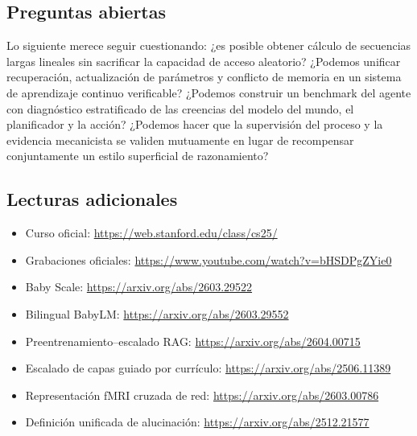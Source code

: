 \subsection{Preguntas abiertas}

Lo siguiente merece seguir cuestionando: ¿es posible obtener cálculo de secuencias largas lineales sin sacrificar la capacidad de acceso aleatorio? ¿Podemos unificar recuperación, actualización de parámetros y conflicto de memoria en un sistema de aprendizaje continuo verificable? ¿Podemos construir un benchmark del agente con diagnóstico estratificado de las creencias del modelo del mundo, el planificador y la acción? ¿Podemos hacer que la supervisión del proceso y la evidencia mecanicista se validen mutuamente en lugar de recompensar conjuntamente un estilo superficial de razonamiento?

\subsection{Lecturas adicionales}

\begin{itemize}
  \item Curso oficial: \url{https://web.stanford.edu/class/cs25/}
  \item Grabaciones oficiales: \url{https://www.youtube.com/watch?v=bHSDPgZYie0}
  \item Baby Scale: \url{https://arxiv.org/abs/2603.29522}
  \item Bilingual BabyLM: \url{https://arxiv.org/abs/2603.29552}
  \item Preentrenamiento--escalado RAG: \url{https://arxiv.org/abs/2604.00715}
  \item Escalado de capas guiado por currículo: \url{https://arxiv.org/abs/2506.11389}
  \item Representación fMRI cruzada de red: \url{https://arxiv.org/abs/2603.00786}
  \item Definición unificada de alucinación: \url{https://arxiv.org/abs/2512.21577}
\end{itemize}


